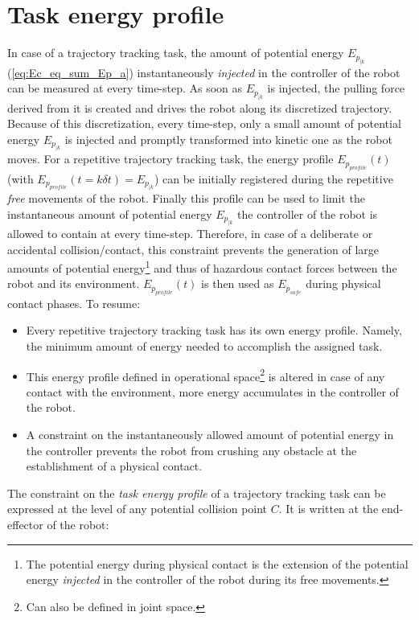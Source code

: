 \section{Task energy profile} 
\label{subsec:Task_energy_profile}
In case of a trajectory tracking task, the amount of potential energy $E_{p_{|k}}$ (\ref{eq:Ec_eq_sum_Ep_a}) instantaneously \textit{injected} in the  controller of the robot can be measured at every time-step. As soon as $E_{p_{|k}}$ is injected, the pulling force derived from it is created and drives the robot along its discretized trajectory. Because of this discretization, every time-step, only a small amount of potential energy $E_{p_{|k}}$ is injected and promptly transformed into kinetic one as the robot moves. For a repetitive trajectory tracking task, the energy profile $E_{p_{profile}}(t)$ (with $E_{p_{profile}}(t=k \delta t) = E_{p_{|k}}$) can be initially registered during the repetitive \textit{free} movements of the robot. Finally this profile can be used to limit the instantaneous amount of potential energy $E_{p_{|k}}$ the controller of the robot is allowed to contain at every time-step. Therefore, in case of a deliberate or accidental collision/contact, this constraint prevents the generation of large amounts of potential energy\footnote{The potential energy during physical contact is the extension of the potential energy \textit{injected} in the controller of the robot during its free movements.} and thus of hazardous contact forces between the robot and its environment. $E_{p_{profile}}(t)$ is then used as $E_{p_{safe}}$ during physical contact phases.
To resume:
\begin{itemize}
\item Every repetitive trajectory tracking task has its own energy profile. Namely, the minimum amount of energy needed to accomplish the assigned task.
\item This energy profile defined in operational space\footnote{Can also be defined in joint space.} is altered in case of any contact with the environment, more energy accumulates in the controller of the robot.
\item A constraint on the instantaneously allowed amount of potential energy in the controller prevents the robot from crushing any obstacle at the establishment of a physical contact. 
\end{itemize}
The constraint on the \textit{task energy profile} of a trajectory tracking task can be expressed at the level of any potential collision point $C$. It is written at the end-effector of the robot:   
